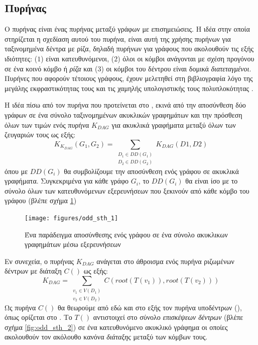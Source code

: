 \subsection{Πυρήνας }
\label{ssec:odd-sth}
Ο πυρήνας  είναι ένας πυρήνας μεταξύ γράφων με επισημειώσεις.
Η ιδέα στην οποία στηρίζεται η σχεδίαση αυτού του πυρήνα, είναι αυτή της χρήσης πυρήνων για ταξινομημένα δέντρα με ρίζα, δηλαδή πυρήνων για γράφους που ακολουθούν τις εξής ιδιότητες: ($1$) είναι κατευθυνόμενοι, ($2$) όλοι οι κόμβοι ανάγονται με σχέση προγόνου σε ένα κοινό κόμβο ή \textit{ρίζα} και ($3$) οι κόμβοι του δέντρου είναι δομικά \textit{διατεταγμένοι}.
Πυρήνες που αφορούν τέτοιους γράφους, έχουν μελετηθεί στη βιβλιογραφία λόγο της μεγάλης εκφραστικότητας τους και τις χαμηλής υπολογιστικής τους πολυπλοκότητας \cite{Haussler99ck, MA_ECML_2006, Vishwanathan2002}.\par
Η ιδέα πίσω από τον πυρήνα  που προτείνεται στο \cite{Martino2012ATK}, εκινά από την αποσύνθεση δύο γράφων σε ένα σύνολο ταξινομημένων ακυκλικών γραφημάτων και την πρόσθεση όλων των τιμών ενός πυρήνα $K_{DAG}$ για ακυκλικά γραφήματα μεταξύ όλων των ζευγαριών τους ως εξής:
\begin{equation}
K_{K_{DAG}}(G_{1}, G_{2}) = \sum_{\substack{D_{1} \in DD(G_{1}) \\
D_{2} \in DD(G_{2})}} K_{DAG}(D1, D2)
\end{equation}
όπου με $DD(G_{i})$ θα συμβολίζουμε την αποσύνθεση ενός γράφου σε ακυκλικά γραφήματα.
Συγκεκριμένα για κάθε γράφο $G_{i}$, το $DD(G_{i})$ θα είναι ίσο με το σύνολο όλων των κατευθυνόμενων εξερευνήσεων  που ξεκινούν από κάθε κόμβο του γράφου (βλέπε σχήμα \ref{fig:odd:bfs_explorations})
\begin{figure}[]
\centering
\texttt{[image: figures/odd\_sth\_1]}
\caption{Ένα παράδειγμα αποσύνθεσης ενός γράφου σε ένα σύνολο ακυκλικων γραφημάτων μέσω εξερευνήσεων }
\label{fig:odd:bfs_explorations}
\end{figure}
Εν συνεχεία, ο πυρήνας $K_{DAG}$ ανάγεται στο άθροισμα ενός πυρήνα ριζωμένων δέντρων με διάταξη $C()$ ως εξής:
\begin{equation}
K_{DAG} = \sum_{\substack{v_{1} \in V(D_{1}) \\ v_{2} \in V(D_{2})}} C(root(T(v_{1})), root(T(v_{2})))
\end{equation}
Ως πυρήνα $C()$ θα θεωρούμε από εδώ και στο εξής τον πυρήνα υποδέντρων (), όπως ορίζεται στο \cite{STKernel}.
Το $T()$ αντιστοιχεί στο σύνολο \textit{επισκέψεων δέντρων} (βλέπε σχήμα \ref{fig:odd_sth_2}) σε ένα κατευθυνόμενο ακυκλικό γράφημα οι οποίες ακολουθούν τον ακόλουθο κανόνα \textit{διάταξης} μεταξύ των κόμβων τους.
